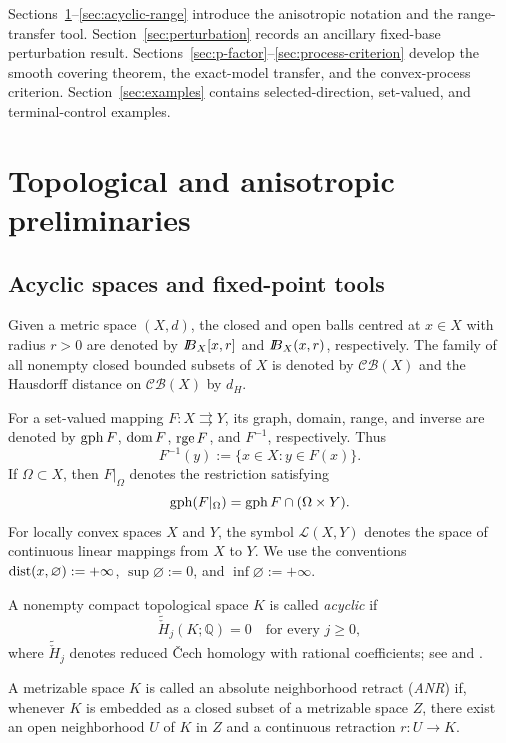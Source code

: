 \documentclass[11pt]{amsart}
\theoremstyle{definition}
\theoremstyle{remark}
\newcommand{\tto}{\rightrightarrows}
\newcommand{\Lin}{\mathcal L}
\newcommand{\CB}{\mathcal{CB}}
\newcommand{\gph}{\mathop{\rm gph}\nolimits}
\newcommand{\domm}{\mathop{\rm dom}\nolimits}
\newcommand{\rge}{\mathop{\rm rge}\nolimits}
\newcommand{\dist}{\mathop{\rm dist}\nolimits}
\def\ball{{I\kern -.35em B}}
\begin{document}
	Sections~\ref{sec:preliminaries}--\ref{sec:acyclic-range} introduce the
	anisotropic notation and the range-transfer tool.
	Section~\ref{sec:perturbation} records an ancillary fixed-base perturbation
	result.
	Sections~\ref{sec:p-factor}--\ref{sec:process-criterion} develop the smooth
	covering theorem, the exact-model transfer, and the convex-process criterion.
	Section~\ref{sec:examples} contains selected-direction, set-valued, and
	terminal-control examples.
	
	\section{Topological and anisotropic preliminaries}
	\label{sec:preliminaries}
	
	\subsection{Acyclic spaces and fixed-point tools}
	
	Given a metric space $(X,d)$, the closed and open balls centred at
	$x\in X$ with radius $r>0$ are denoted by $\ball_X[x,r]$ and
	$\ball_X(x,r)$, respectively.  The family of all nonempty closed bounded
	subsets of $X$ is denoted by $\CB(X)$ and the Hausdorff distance on
	$\CB(X)$ by $d_H$.
	
	For a set-valued mapping $F:X\tto Y$, its graph, domain, range, and inverse
	are denoted by $\gph F$, $\domm F$, $\rge F$, and $F^{-1}$, respectively.
	Thus
	$$
	F^{-1}(y):=\{x\in X:y\in F(x)\}.
	$$
	If $\Omega\subset X$, then $F\vert_{\Omega}$ denotes the restriction
	satisfying
	$$
	\gph(F\vert_{\Omega})=\gph F\cap(\Omega\times Y).
	$$
	For locally convex spaces $X$ and $Y$, the symbol $\Lin(X,Y)$ denotes the
	space of continuous linear mappings from $X$ to $Y$.
	We use the conventions $\dist(x,\varnothing):=+\infty$,
	$\sup\varnothing:=0$, and $\inf\varnothing:=+\infty$.
	
	A nonempty compact topological space $K$ is called \emph{acyclic} if
	$$
	\widetilde{\check H}_j(K;\mathbb Q)=0
	\quad\text{for every }j\ge 0,
	$$
	where $\widetilde{\check H}_j$ denotes reduced \v{C}ech homology with
	rational coefficients; see \cite[Chapter~I]{Gorniewicz} and
	\cite[Chapters~IX--X]{EilenbergSteenrod}.
	
	A metrizable space $K$ is called an absolute neighborhood retract
	(\emph{ANR}) if, whenever $K$ is embedded as a closed subset of a
	metrizable space $Z$, there exist an open neighborhood $U$ of $K$ in
	$Z$ and a continuous retraction
	$r:U\longrightarrow K.$
	
\end{document}
